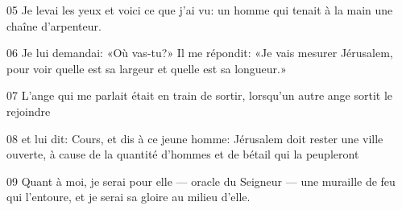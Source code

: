 05 Je levai les yeux et voici ce que j’ai vu: un homme qui tenait à la main une chaîne d’arpenteur.

06 Je lui demandai: «Où vas-tu?» Il me répondit: «Je vais mesurer Jérusalem, pour voir quelle est sa largeur et quelle est sa longueur.»

07 L’ange qui me parlait était en train de sortir, lorsqu’un autre ange sortit le rejoindre

08 et lui dit: Cours, et dis à ce jeune homme: Jérusalem doit rester une ville ouverte, à cause de la quantité d’hommes et de bétail qui la peupleront

09 Quant à moi, je serai pour elle --- oracle du Seigneur --- une muraille de feu qui l’entoure, et je serai sa gloire au milieu d’elle.